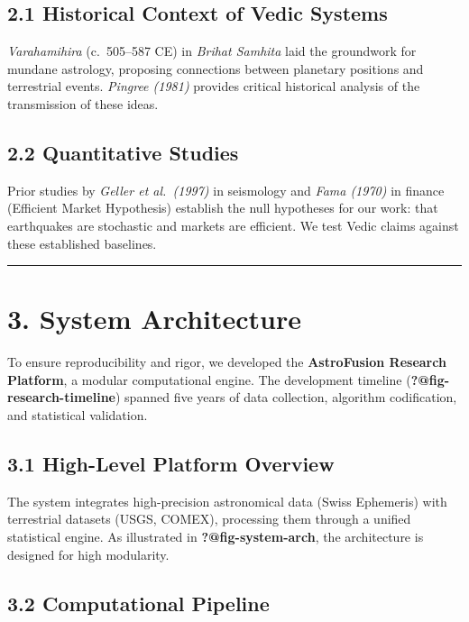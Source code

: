 \documentclass[
  11pt,
  a4paper,
  oneside,
  openany]{report}
\begin{document}
\subsection{2.1 Historical Context of Vedic
Systems}\label{historical-context-of-vedic-systems}

\emph{Varahamihira} (c.~505--587 CE) in \emph{Brihat Samhita} laid the
groundwork for mundane astrology, proposing connections between
planetary positions and terrestrial events. \emph{Pingree (1981)}
provides critical historical analysis of the transmission of these
ideas.

\subsection{2.2 Quantitative Studies}\label{quantitative-studies}

Prior studies by \emph{Geller et al.~(1997)} in seismology and
\emph{Fama (1970)} in finance (Efficient Market Hypothesis) establish
the null hypotheses for our work: that earthquakes are stochastic and
markets are efficient. We test Vedic claims against these established
baselines.

\begin{center}\rule{0.5\linewidth}{0.5pt}\end{center}

\section{3. System Architecture}\label{system-architecture}

To ensure reproducibility and rigor, we developed the
\textbf{AstroFusion Research Platform}, a modular computational engine.
The development timeline (\textbf{?@fig-research-timeline}) spanned five
years of data collection, algorithm codification, and statistical
validation.

\subsection{3.1 High-Level Platform
Overview}\label{high-level-platform-overview}

The system integrates high-precision astronomical data (Swiss Ephemeris)
with terrestrial datasets (USGS, COMEX), processing them through a
unified statistical engine. As illustrated in
\textbf{?@fig-system-arch}, the architecture is designed for high
modularity.

\subsection{3.2 Computational Pipeline}\label{computational-pipeline}
\end{document}
